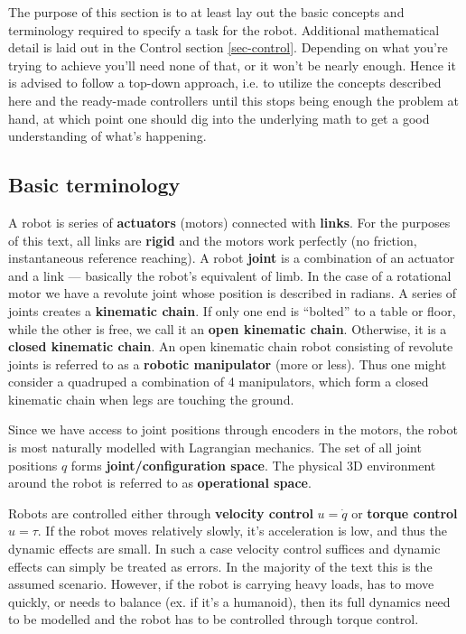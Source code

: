 The purpose of this section is to at least lay out
the basic concepts and terminology required to specify 
a task for the robot. Additional mathematical detail
is laid out in the Control section \ref{sec-control}.
Depending on what you're trying to achieve you'll need
none of that, or it won't be nearly enough.
Hence it is advised to follow a top-down approach, 
i.e. to utilize the concepts described here and the 
ready-made controllers until this stops being enough the problem at
hand, at which point one should dig into the underlying math
to get a good understanding of what's happening.

\subsection{Basic terminology}
\label{sec-robotics-terminology}
A robot is series of \textbf{actuators} (motors) connected with 
\textbf{links}. For the purposes of this text, all
links are \textbf{rigid} and the motors work perfectly
(no friction, instantaneous reference reaching).
A robot \textbf{joint} is a combination of an actuator
and a link --- basically the robot's equivalent of limb.
In the case of a rotational motor we have
a revolute joint whose position is described in radians.
A series of joints creates a \textbf{kinematic chain}.
If only one end is ``bolted'' to a table or floor,
while the other is free, we call it an \textbf{open kinematic chain}.
Otherwise, it is a \textbf{closed kinematic chain}.
An open kinematic chain robot consisting of revolute joints
is referred to as a \textbf{robotic manipulator} (more or less).
Thus one might consider a quadruped a combination of 4 manipulators,
which form a closed kinematic chain when legs are touching the ground.

Since we have access to joint positions through encoders
in the motors, 
the robot is most naturally modelled with Lagrangian mechanics.
The set of all joint positions $ q  $ 
forms \textbf{joint/configuration space}.
The physical 3D environment around the robot
is referred to as \textbf{operational space}.

Robots are controlled either through \textbf{velocity control}
$ u = \dot{q}  $
or \textbf{torque control} $ u = \tau  $. 
If the robot moves relatively slowly, it's acceleration
is low, and thus the dynamic effects are small.
In such a case velocity control suffices and dynamic
effects can simply be treated as errors.
In the majority of the text this is the assumed scenario.
However, if the robot is carrying heavy loads, has to move
quickly, or needs to balance (ex. if it's a humanoid),
then its full dynamics need to be modelled 
and the robot has to be controlled through torque control.

